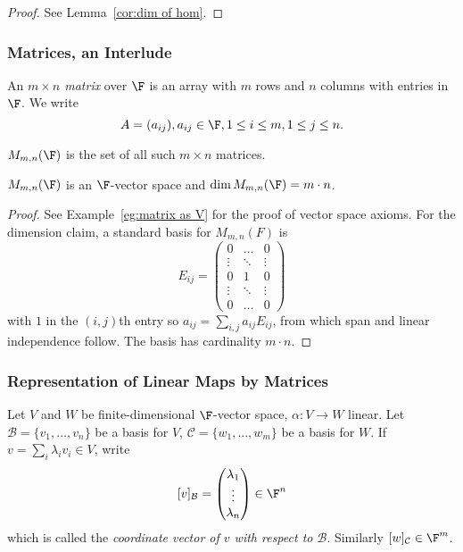 \documentclass[a4paper]{article}
\newcommand*{\basis}{\mathcal}
\theoremstyle{definition}
\begin{document}
\begin{proof}
  See Lemma~\ref{cor:dim of hom}.
\end{proof}

\subsubsection{Matrices, an Interlude}

\begin{definition}[Matrix]
  An \emph{\(m\times n\) matrix} over \(\F\) is an array with \(m\) rows and \(n\) columns with entries in \(\F\). We write
  \[
A = (a_{ij}), a_{ij}\in\F, 1\leq i \leq m, 1\leq j \leq n.
  \]
\end{definition}

\begin{definition}
  \(M_{m,n}(\F)\) is the set of all such \(m\times n\) matrices.
\end{definition}

\begin{proposition}
  \(M_{m,n}(\F)\) is an \(\F\)-vector space and \(\dim M_{m,n}(\F) = m\cdot n\).
\end{proposition}

\begin{proof}
  See Example~\ref{eg:matrix as V} for the proof of vector space axioms. For the dimension claim, a standard basis for \(M_{m,n}(F)\) is
  \[
    E_{ij}=
    \begin{pmatrix}
      0 & \dots & 0 \\
      \vdots & \ddots & \vdots \\
      0 & 1 & 0 \\
      \vdots & \ddots & \vdots \\
      0 & \dots & 0 
    \end{pmatrix}
  \]
  with \(1\) in the \((i,j)\)th entry so \(a_{ij} = \sum_{i,j}^{} a_{ij}E_{ij}\), from which span and linear independence follow. The basis has cardinality \(m\cdot n\).
\end{proof}

\subsubsection{Representation of Linear Maps by Matrices}

Let \(V\) and \(W\) be finite-dimensional \(\F\)-vector space, \(\alpha: V\to W\) linear. Let \(\basis B = \{v_1,\ldots,v_n\}\) be a basis for \(V\), \(\basis C = \{w_1,\ldots,w_m\}\) be a basis for \(W\). If \(v=\sum_{i}\lambda_iv_i \in V\), write
\[
[v]_{\basis B} =
\begin{pmatrix}
  \lambda_1 \\
  \vdots \\
  \lambda_n
\end{pmatrix}
\in \F^n
\]
which is called the \emph{coordinate vector of \(v\) with respect to \(\basis B\)}. Similarly \([w]_{\basis C}\in \F^m\).
\end{document}
